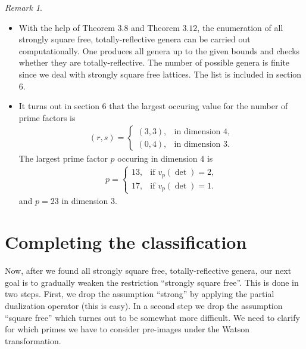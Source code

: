 \documentclass{amsart}
\theoremstyle{definition}
\theoremstyle{remark}
\newtheorem{rem}[thm]{Remark}
\begin{document}
\begin{rem}\ 
 \begin{itemize}
  \item[(1)] With the help of Theorem $3.8$ and Theorem $3.12$, the enumeration of all strongly square free, totally-reflective genera can be carried out computationally.
       One produces all genera up to the given bounds and checks whether they are totally-reflective. The number of possible genera is finite since we deal with strongly square free lattices.
       The list is included in section $6$.
  \item[(2)] It turns out in section $6$ that the largest occuring value for the number of prime factors is 
             \begin{align*}
              (r,s)=
               \begin{cases}
                (3,3), & \text{in dimension $4$}, \\
                (0,4), & \text{in dimension $3$}. 
               \end{cases}
              \end{align*}
             The largest prime factor $p$ occuring in dimension $4$ is
             \begin{align*}
              p=
               \begin{cases}
                13, & \text{if $v_p(\det) = 2$}, \\
                17, & \text{if $v_p(\det) = 1$}. 
               \end{cases}
              \end{align*}
              and $p = 23$ in dimension 3.
 \end{itemize}
\end{rem}

\section{Completing the classification}
Now, after we found all strongly square free, totally-reflective genera, our next goal is to gradually weaken the restriction ``strongly square free''.
This is done in two steps. First, we drop the assumption ``strong'' by applying the partial dualization operator (this is easy). 
In a second step we drop the assumption ``square free'' which turnes out to be somewhat more difficult. 
We need to clarify for which primes we have to consider pre-images under the Watson transformation.
\end{document}
